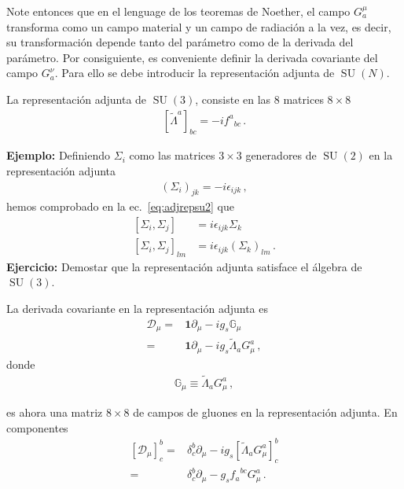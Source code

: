 Note entonces que en el lenguage de los teoremas de Noether, el campo $G^{\mu}_{a}$ transforma como un campo material y un campo de radiación a la vez, es decir, su transformación depende tanto del parámetro como de la derivada del parámetro. Por consiguiente, es conveniente definir la derivada covariante del campo $G^{\nu}_{a}$. Para ello se debe introducir la representación adjunta de $\operatorname{SU}(N)$.

\begin{frame}
La representación adjunta de $\operatorname{SU}(3)$, consiste en las 8 matrices $8\times 8$
\begin{align}
  \left[  \widetilde{\Lambda}^{a}\right]_{bc}=-i {f^{a}}_{bc}\,.
\end{align}
\end{frame}

\noindent
\textbf{Ejemplo:} Definiendo $\Sigma_i$ como las matrices $3\times3$ generadores de $\operatorname{SU}(2)$ en la representaci\'on adjunta
\begin{align}
  (\Sigma_i)_{jk}=-i\epsilon_{ijk}\,,
\end{align}
hemos comprobado en la ec.~\eqref{eq:adjrepsu2} que
\begin{align}
  \left[{\Sigma_i},{\Sigma_j}\right]&=i\epsilon_{ijk}{\Sigma_k}\nonumber\\
  \left[{\Sigma_i},{\Sigma_j}\right]_{lm}&=i\epsilon_{ijk}(\Sigma_k)_{lm}\,.
\end{align}
\noindent
\textbf{Ejercicio:} Demostar que la representación adjunta satisface el álgebra de $\operatorname{SU}(3)$.

\begin{frame}
La derivada covariante en la representación adjunta es
\begin{align}
  \mathcal{D}_{\mu}=&\mathbf{1}\partial_{\mu}-i g_s \mathbb{G}_{\mu}  \nonumber\\
=&\mathbf{1}\partial_{\mu}-i g_s \widetilde{\Lambda}_a G_{\mu}^{a} \,,
\end{align}
donde
\begin{align}
  \mathbb{G}_{\mu}\equiv \widetilde{\Lambda}_a G_{\mu}^{a}\,,
\end{align}
\end{frame}
es ahora una matriz $8\times8$ de campos de gluones en la representación adjunta. En componentes
\begin{align}
 \left[\mathcal{D}_{\mu} \right]^b_c=&\delta^b_c\partial_{\mu}-i g_{s}\left[ \widetilde{\Lambda}_{a} G^a_{\mu} \right]^b_c \nonumber\\
                  =&\delta^b_c\partial_{\mu}- g_{s} {f_{a}}^{bc}  G^a_{\mu} \,.
\end{align}

